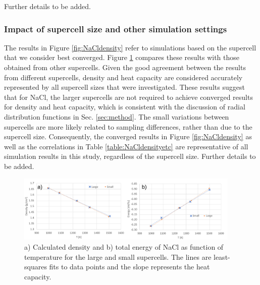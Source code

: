 \documentclass[preprint,3p,10pt,twocolumn,number,sort&compress]{elsarticle}
\begin{document}

{\color{red}Further details to be added.}

\subsubsection{Impact of supercell size and other simulation settings}
The results in Figure \ref{fig:NaCldensity} refer to simulations based on the supercell that we consider best converged. Figure \ref{fig:NaClsize} compares these results with those obtained from other supercells. Given the good agreement between the results from different supercells, density and heat capacity are considered accurately represented by all supercell sizes that were investigated.
 These results suggest that for NaCl, the larger supercells are not required to achieve converged results for density and heat capacity, which is consistent with the discussion of radial distribution functions in Sec. \ref{sec:method}. The small variations between supercells are more likely related to sampling differences, rather than due to the supercell size. Consequently, the converged results in Figure \ref{fig:NaCldensity} as well as the correlations in Table \ref{table:NaCldensityetc} are representative of all simulation results in this study, regardless of the supercell size. {\color{red} Further details to be added.} %

\begin{figure}[htb]
\centering
\includegraphics[width=0.95\textwidth]{FIG3b.pdf}
\caption{a) Calculated density and b) total energy of NaCl as function of temperature for the large and small supercells. The lines are least-squares fits to data points and the slope represents the heat capacity.} 
\label{fig:NaClsize}
\end{figure}
\end{document}
